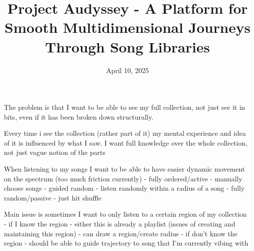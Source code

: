 \documentclass{src/ecsgdp}
\begin{document}
\frontmatter
\title{Project Audyssey - A Platform for Smooth Multidimensional Journeys Through Song Libraries}
\date       {April 10, 2025}
\maketitle

\begin{abstract}

\end{abstract}



\tableofcontents
\listoffigures
\listoftables
\lstlistoflistings



\mainmatter



The problem is that I want to be able to see my full collection, not just see it in bits, even if it has been broken down structurally.

Every time i see the collection (rather part of it) my mental experience and idea of it is influenced by what I saw. I want full knowledge over the whole collection, not just vague notion of the parts

When listening to my songs I want to be able to have easier dynamic movement on the spectrum (too much friction currently)
- fully ordered/active - manually choose songs
- guided random - listen randomly within a radius of a song
- fully random/passive - just hit shuffle

Main issue is sometimes I want to only listen to a certain region of my collection
- if I know the region
    - either this is already a playlist (issues of creating and maintaining this region)
    - can draw a region/create radius
- if don't know the region - should be able to guide trajectory to song that I'm currently vibing with
\end{document}
